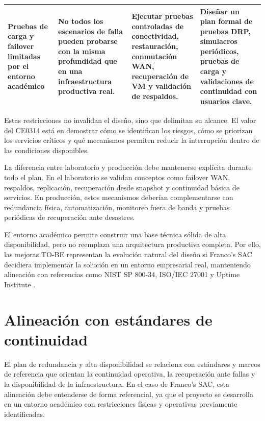 \documentclass[11pt, a4paper, oneside]{report}
\begin{document}
\begin{landscape}
\begin{xltabular}{\linewidth}{@{}|L{3.8cm}|L{4.5cm}|L{5.5cm}|X|@{}}
{\small Pruebas de carga y failover limitadas por el entorno académico} &
{\small No todos los escenarios de falla pueden probarse con la misma profundidad que en una infraestructura productiva real.} &
{\small Ejecutar pruebas controladas de conectividad, restauración, conmutación WAN, recuperación de VM y validación de respaldos.} &
{\small Diseñar un plan formal de pruebas DRP, simulacros periódicos, pruebas de carga y validaciones de continuidad con usuarios clave.} \\ \hline

\end{xltabular}

\normalsize
\end{landscape}

Estas restricciones no invalidan el diseño, sino que delimitan su alcance. El valor del CE0314 está en demostrar cómo se identifican los riesgos, cómo se priorizan los servicios críticos y qué mecanismos permiten reducir la interrupción dentro de las condiciones disponibles.

La diferencia entre laboratorio y producción debe mantenerse explícita durante todo el plan. En el laboratorio se validan conceptos como failover WAN, respaldos, replicación, recuperación desde snapshot y continuidad básica de servicios. En producción, estos mecanismos deberían complementarse con redundancia física, automatización, monitoreo fuera de banda y pruebas periódicas de recuperación ante desastres.

El entorno académico permite construir una base técnica sólida de alta disponibilidad, pero no reemplaza una arquitectura productiva completa. Por ello, las mejoras TO-BE representan la evolución natural del diseño si Franco's SAC decidiera implementar la solución en un entorno empresarial real, manteniendo alineación con referencias como NIST SP 800-34, ISO/IEC 27001 y Uptime Institute \cite{nist80034,iso27001,uptime}.

\section{Alineación con estándares de continuidad}

El plan de redundancia y alta disponibilidad se relaciona con estándares y marcos de referencia que orientan la continuidad operativa, la recuperación ante fallas y la disponibilidad de la infraestructura. En el caso de Franco's SAC, esta alineación debe entenderse de forma referencial, ya que el proyecto se desarrolla en un entorno académico con restricciones físicas y operativas previamente identificadas.
\end{document}
